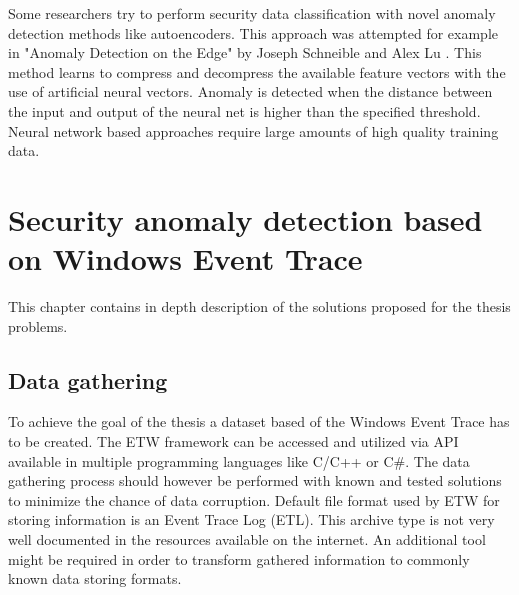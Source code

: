 \documentclass[a4paper,twoside,12pt]{book}
\begin{document}
Some researchers try to perform security
data classification with novel anomaly detection methods like autoencoders. This approach was
attempted for example in "Anomaly Detection on the Edge" by Joseph Schneible and Alex Lu
\cite{bib:autoencoderDist}. This method learns to compress and decompress the available feature 
vectors with the use of artificial neural vectors. Anomaly is detected when the distance 
between the input and output of the neural net is higher than the specified threshold.
Neural network based approaches require large amounts of high quality training data.  


\chapter{Security anomaly detection based on Windows Event Trace}

This chapter contains in depth description of the solutions proposed for the thesis problems. 

\section{Data gathering}

To achieve the goal of the thesis a dataset based of the Windows Event Trace has to 
be created. The ETW framework can be accessed and utilized via API available in multiple
programming languages like C/C++\cite{bib:etwcpp} or C\#\cite{bib:etwcsharp}. The 
data gathering process should however be performed with known and tested solutions to
minimize the chance of data corruption. Default file format used by ETW for storing 
information is an Event Trace Log (ETL). This archive type is not very well documented in 
the resources available on the internet. An additional tool might be required in order to 
transform gathered information to commonly known data storing formats.
\end{document}
